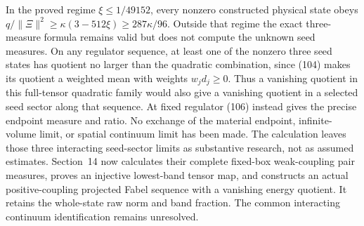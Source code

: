 In the proved regime \(\xi\le1/49152\), every nonzero constructed
physical state obeys \(q/\|\Xi\|^2\ge\kappa(3-512\xi)\ge287\kappa/96\).
Outside that regime the exact three-measure formula remains valid but
does not compute the unknown seed measures. On any regulator sequence,
at least one of the nonzero three seed states has quotient no larger
than the quadratic combination, since (104) makes its quotient a
weighted mean with weights \(w_jd_j\ge0\). Thus a vanishing quotient in
this full-tensor quadratic family would also give a vanishing quotient
in a selected seed sector along that sequence. At fixed regulator (106)
instead gives the precise endpoint measure and ratio. No exchange of the
material endpoint, infinite-volume limit, or spatial continuum limit has
been made. The calculation leaves those three interacting seed-sector
limits as substantive research, not as assumed estimates. Section~14 now
calculates their complete fixed-box weak-coupling pair measures, proves
an injective lowest-band tensor map, and constructs an actual
positive-coupling projected Fabel sequence with a vanishing energy
quotient. It retains the whole-state raw norm and band fraction. The
common interacting continuum identification remains unresolved.
